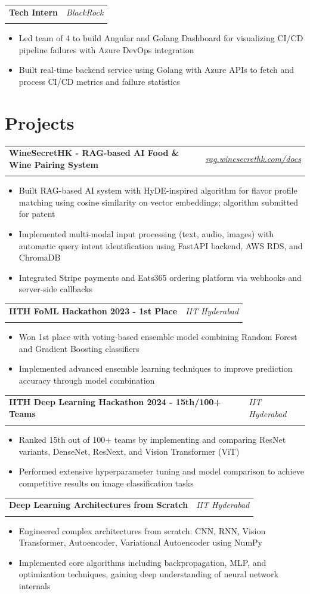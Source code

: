 \documentclass[11pt,a4paper]{article}
\makeatletter
\newcommand{\resumeItem}[1]{\item\small{#1}}
\newlength{\resumeLeftCol}
\newlength{\resumeRightCol}
\newcommand{\resumeHeading}[4]{
  \begin{tabular*}{\textwidth}{@{}p{\resumeLeftCol}@{\extracolsep{\fill}}>{\raggedleft\arraybackslash}p{\resumeRightCol}@{}}
    \textbf{#1} & \textit{#2} \\
    & \textit{\ifstrempty{#4}{#3}{#3 \ #4}}
  \end{tabular*}
  \vspace{-4pt}
}
\makeatother
\begin{document}
\resumeHeading{Tech Intern}{BlackRock}{January 2021 - July 2021}{}
\begin{itemize}[leftmargin=*,noitemsep,topsep=0pt]
    \resumeItem{Led team of 4 to build Angular and Golang Dashboard for visualizing CI/CD pipeline failures with Azure DevOps integration}
    \resumeItem{Built real-time backend service using Golang with Azure APIs to fetch and process CI/CD metrics and failure statistics}
\end{itemize}

\section{Projects}
\resumeHeading{WineSecretHK - RAG-based AI Food \& Wine Pairing System}{\href{https://rag.winesecrethk.com/docs}{rag.winesecrethk.com/docs}}{}{}
\begin{itemize}[leftmargin=*,noitemsep,topsep=0pt]
    \resumeItem{Built RAG-based AI system with HyDE-inspired algorithm for flavor profile matching using cosine similarity on vector embeddings; algorithm submitted for patent}
    \resumeItem{Implemented multi-modal input processing (text, audio, images) with automatic query intent identification using FastAPI backend, AWS RDS, and ChromaDB}
    \resumeItem{Integrated Stripe payments and Eats365 ordering platform via webhooks and server-side callbacks}
\end{itemize}

\resumeHeading{IITH FoML Hackathon 2023 - 1st Place}{IIT Hyderabad}{2023}{}
\begin{itemize}[leftmargin=*,noitemsep,topsep=0pt]
    \resumeItem{Won 1st place with voting-based ensemble model combining Random Forest and Gradient Boosting classifiers}
    \resumeItem{Implemented advanced ensemble learning techniques to improve prediction accuracy through model combination}
\end{itemize}

\resumeHeading{IITH Deep Learning Hackathon 2024 - 15th/100+ Teams}{IIT Hyderabad}{2024}{}
\begin{itemize}[leftmargin=*,noitemsep,topsep=0pt]
    \resumeItem{Ranked 15th out of 100+ teams by implementing and comparing ResNet variants, DenseNet, ResNext, and Vision Transformer (ViT)}
    \resumeItem{Performed extensive hyperparameter tuning and model comparison to achieve competitive results on image classification tasks}
\end{itemize}

\resumeHeading{Deep Learning Architectures from Scratch}{IIT Hyderabad}{2023-2024}{}
\begin{itemize}[leftmargin=*,noitemsep,topsep=0pt]
    \resumeItem{Engineered complex architectures from scratch: CNN, RNN, Vision Transformer, Autoencoder, Variational Autoencoder using NumPy}
    \resumeItem{Implemented core algorithms including backpropagation, MLP, and optimization techniques, gaining deep understanding of neural network internals}
\end{itemize}
\end{document}
